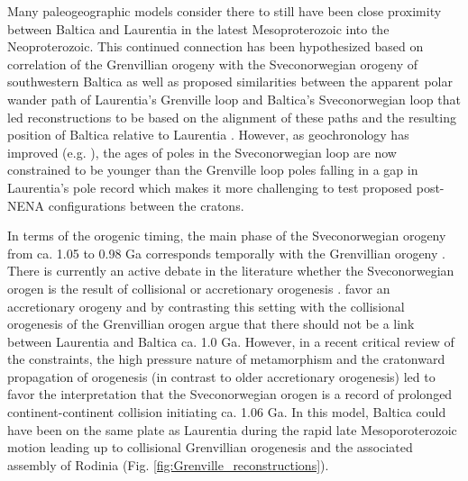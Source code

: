 \documentclass[twocolumn, switch]{article} %
\begin{document}
Many paleogeographic models consider there to still have been close proximity between Baltica and Laurentia in the latest Mesoproterozoic into the Neoproterozoic. This continued connection has been hypothesized based on correlation of the Grenvillian orogeny with the Sveconorwegian orogeny of southwestern Baltica \citep{Gower1990b} as well as proposed similarities between the apparent polar wander path of Laurentia's Grenville loop and Baltica's Sveconorwegian loop that led reconstructions to be based on the alignment of these paths and the resulting position of Baltica relative to Laurentia \citep{Piper1980a,Pisarevsky2003a}. However, as geochronology has improved (e.g. \citealp{Gong2018b}), the ages of poles in the Sveconorwegian loop are now constrained to be younger than the Grenville loop poles falling in a gap in Laurentia's pole record \citep{Evans2015a,Fairchild2017a} which makes it more challenging to test proposed post-NENA configurations between the cratons.

In terms of the orogenic timing, the main phase of the Sveconorwegian orogeny from ca. 1.05 to 0.98 Ga corresponds temporally with the Grenvillian orogeny \citep{Stephens2020a}. There is currently an active debate in the literature whether the Sveconorwegian orogen is the result of collisional or accretionary orogenesis \citep{Stephens2020a}. \cite{Slagstad2019a} favor an accretionary orogeny and by contrasting this setting with the collisional orogenesis of the Grenvillian orogen argue that there should not be a link between Laurentia and Baltica ca. 1.0 Ga. However, in a recent critical review of the constraints, the high pressure nature of metamorphism and the cratonward propagation of orogenesis (in contrast to older accretionary orogenesis) led \cite{Stephens2020a} to favor the interpretation that the Sveconorwegian orogen is a record of prolonged continent-continent collision initiating ca. 1.06 Ga. In this model, Baltica could have been on the same plate as Laurentia during the rapid late Mesoporoterozoic motion leading up to collisional Grenvillian orogenesis and the associated assembly of Rodinia (Fig. \ref{fig:Grenville_reconstructions}).
\end{document}
